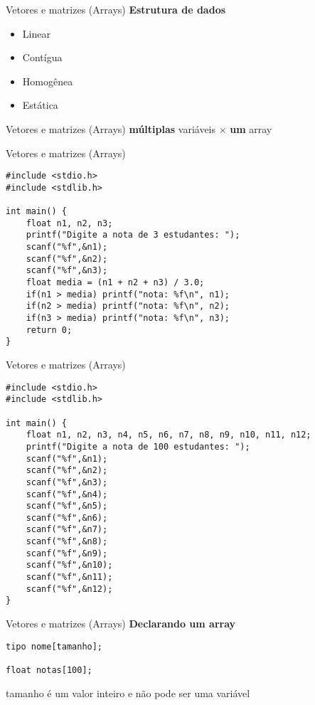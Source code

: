 \documentclass[10pt]{beamer}
\subtitle{Aula 2}
\date{30 de outubro de 2019}
\begin{document}
\maketitle

\begin{frame}{Vetores e matrizes (Arrays)}
    \huge
    \textbf{Estrutura de dados}
    
    \begin{itemize}
        \item Linear
        \item Contígua
        \item Homogênea
        \item Estática
    \end{itemize}
\end{frame}

\begin{frame}{Vetores e matrizes (Arrays)}
    \huge \textbf{múltiplas} variáveis $\times$ \textbf{um} array
\end{frame}

\begin{frame}[fragile]{Vetores e matrizes (Arrays)}
    \begin{verbatim}
#include <stdio.h>
#include <stdlib.h>

int main() {
    float n1, n2, n3;
    printf("Digite a nota de 3 estudantes: ");
    scanf("%f",&n1);
    scanf("%f",&n2);
    scanf("%f",&n3);
    float media = (n1 + n2 + n3) / 3.0;
    if(n1 > media) printf("nota: %f\n", n1);
    if(n2 > media) printf("nota: %f\n", n2);
    if(n3 > media) printf("nota: %f\n", n3);
    return 0;
}
    \end{verbatim}
\end{frame}

\begin{frame}[fragile]{Vetores e matrizes (Arrays)}
    \begin{verbatim}
#include <stdio.h>
#include <stdlib.h>

int main() {
    float n1, n2, n3, n4, n5, n6, n7, n8, n9, n10, n11, n12;
    printf("Digite a nota de 100 estudantes: ");
    scanf("%f",&n1);
    scanf("%f",&n2);
    scanf("%f",&n3);
    scanf("%f",&n4);
    scanf("%f",&n5);
    scanf("%f",&n6);
    scanf("%f",&n7);
    scanf("%f",&n8);
    scanf("%f",&n9);
    scanf("%f",&n10);
    scanf("%f",&n11);
    scanf("%f",&n12);
}
    \end{verbatim}
\end{frame}

\begin{frame}[fragile]{Vetores e matrizes (Arrays)}
    \huge
    \textbf{Declarando um array}
    
    \bigskip
    
    \begin{verbatim}
tipo nome[tamanho];

float notas[100];
    \end{verbatim}
    
    \Large
    tamanho é um valor inteiro e não pode ser uma variável
\end{frame}
\end{document}

